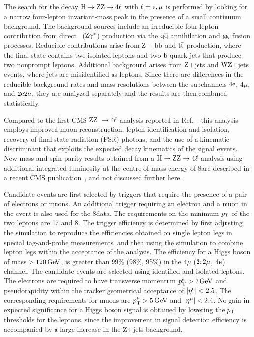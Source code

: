 \documentclass[11pt,twoside,a4paper,cmspaper,final,collab]{cms-tdr}
\begin{document}
The search for the decay $\mathrm{H} \rightarrow  \mathrm{Z}\mathrm{Z}   \rightarrow 4\ell$ with $\ell = \mathrm{e}, \mu$ is performed
by looking for a narrow  four-lepton invariant-mass peak in the presence of a small continuum background.
The background sources include an irreducible four-lepton contribution from direct \cPZ\cPZ\
($\mathrm{Z}\gamma^*$) production via the $\mathrm{q}\mathrm{\overline{q}}$ annihilation and $\mathrm{g}\mathrm{g}$ fusion processes.
Reducible contributions arise from $\mathrm{Z} + \mathrm{b}\overline{\mathrm{b}}$ and $\mathrm{t}\overline{\mathrm{t}}$ production, where the final
state contains two isolated leptons and two $\mathrm{b}$-quark jets that produce two nonprompt leptons.
Additional background arises from $\mathrm{Z}+$jets and $\mathrm{W}\mathrm{Z}+$jets events, where jets are
misidentified as leptons.
Since there are differences in the reducible background rates and mass resolutions between the
subchannels $4\mathrm{e}$, $4\mu$, and $2\mathrm{e}2\mu$, they are analyzed separately and the results are then
combined statistically.

Compared to the first CMS $\mathrm{Z}\mathrm{Z}\ \to 4\ell$ analysis reported in Ref.~\cite{Chatrchyan:2012dg},
this analysis employs improved muon reconstruction, lepton identification
and isolation, recovery of final-state-radiation (FSR) photons, and the use of a kinematic discriminant
that exploits the expected decay kinematics of the signal events.
New mass and spin-parity results obtained from a $\mathrm{H} \rightarrow  \mathrm{Z}\mathrm{Z}   \rightarrow 4\ell$
analysis using additional integrated luminosity at the centre-of-mass energy of 8\TeV are described
in a recent CMS publication~\cite{:2012br}, and not discussed further here.

Candidate events are first selected by triggers that require the presence of a pair of electrons or
muons. An additional trigger requiring an electron and a muon in the event is also used for the 8\TeV data.
The requirements on the minimum $p_{\mathrm{T}}$ of the two leptons are 17 and 8\GeV. %
The trigger efficiency is determined by first adjusting the simulation to reproduce the efficiencies
obtained on single lepton legs in special tag-and-probe measurements, and then using the
simulation to combine lepton legs within the acceptance of the analysis.
The efficiency for a Higgs boson of mass  $> 120\,\text{Ge\hspace{-.08em}V}$, is greater than 99\% (98\%, 95\%) in
the $4\mu$ ($2\mathrm{e} 2\mu$, $4\mathrm{e}$) channel.
The candidate events are selected using identified and isolated leptons.
The electrons are required to have transverse momentum $p_{\mathrm{T}}^{\mathrm{e}} > 7\,\text{Ge\hspace{-.08em}V}$ and pseudorapidity
within the tracker geometrical   acceptance of $|\eta^{\mathrm{e}}| < 2.5$.
The corresponding requirements for muons are $p_{\mathrm{T}}^{{\mu}} > 5\,\text{Ge\hspace{-.08em}V}$ and $|\eta^{{\mu}}| < 2.4$.
No gain in expected significance for a Higgs boson signal
is obtained by lowering the $p_{\mathrm{T}}$ thresholds for the leptons, since the
improvement in signal detection efficiency is accompanied by a large increase in the $\mathrm{Z}+$jets background.
\end{document}
